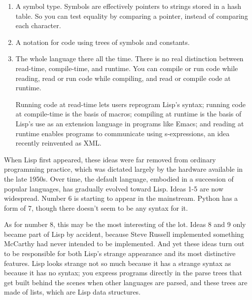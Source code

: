 \begin{enumerate}
                    
\item 
                      A symbol type. Symbols are effectively pointers to strings
                      stored in a hash table. So you can test equality by
                      comparing a pointer, instead of comparing each
                      character.


                    
\item 
                      A notation for code using trees of symbols and
                      constants.


                    
\item 
                      The whole language there all the time. There is no real
                      distinction between read-time, compile-time, and runtime.
                      You can compile or run code while reading, read or run
                      code while compiling, and read or compile code at
                      runtime.

Running code at read-time lets users
                      reprogram Lisp's syntax; running code at compile-time is
                      the basis of macros; compiling at runtime is the basis of
                      Lisp's use as an extension language in programs like
                      Emacs; and reading at runtime enables programs to
                      communicate using s-expressions, an idea recently
                      reinvented as XML.
                    
\end{enumerate}

                  When Lisp first appeared, these ideas were far removed from
                  ordinary programming practice, which was dictated largely by
                  the hardware available in the late 1950s. Over time, the
                  default language, embodied in a succession of popular
                  languages, has gradually evolved toward Lisp. Ideas 1-5 are
                  now widespread. Number 6 is starting to appear in the
                  mainstream. Python has a form of 7, though there doesn't seem
                  to be any syntax for it.

As for number 8, this may
                  be the most interesting of the lot. Ideas 8 and 9 only became
                  part of Lisp by accident, because Steve Russell implemented
                  something McCarthy had never intended to be implemented. And
                  yet these ideas turn out to be responsible for both Lisp's
                  strange appearance and its most distinctive features. Lisp
                  looks strange not so much because it has a strange syntax as
                  because it has no syntax; you express programs directly in the
                  parse trees that get built behind the scenes when other
                  languages are parsed, and these trees are made of lists, which
                  are Lisp data structures.

